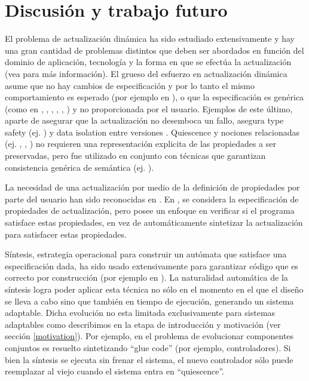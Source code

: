\section{Discusión y trabajo futuro}

El problema de actualización dinámica ha sido estudiado extensivamente y hay una gran cantidad de problemas distintos
que deben ser abordados en función del dominio de aplicación, tecnología y la forma en que se efectúa la actualización
(vea \cite{SMR:SMR1556} para más información). El grueso del esfuerzo en actualización dinámica asume que no hay cambios
de especificación y por lo tanto el mismo comportamiento es esperado (por ejemplo en \cite{mx:icse13}), o que la
especificación es genérica (como en \cite{Shen:2005:TUF:1095430.1081720}, \cite{5551162}, \cite{1167829},
\cite{4221625}, \cite{485222}, \cite{60317}) y no proporcionada por el usuario. Ejemplos de este último, aparte de
asegurar que la actualización no desemboca un fallo, asegura type safety (ej. \cite{Subramanian08dynamicsoftware}) y
data isolation entre versiones \cite{Stoyle07mutatismutandis:}. Quiescence \cite{60317} y nociones relacionadas (ej.
\cite{4359466},  \cite{Anderson:2009:MPM:1656437.1656448}, \cite{485222}) no requieren una representación explicita de
las propiedades a ser preservadas, pero fue utilizado en conjunto con técnicas que garantizan consistencia genérica de
semántica (ej. \cite{5546542}). 

La necesidad de una actualización por medio de la definición de propiedades por parte del usuario han sido reconocidas
en \cite{Baresi:2010:DBD:1882362.1882367}. En \cite{Hayden:2012:SVC:2189314.2189336}, se considera la especificación de
propiedades de actualización, pero posee un enfoque en verificar si el programa satisface estas propiedades, en vez de
automáticamente sintetizar la actualización para satisfacer estas propiedades. 

Síntesis, estrategia operacional para construir un autómata que satisface una especificación dada, ha sido usado
extensivamente para garantizar código que es correcto por construcción (por ejemplo en
\cite{Greenyer:2013:ISC:2491411.2491445}). La naturalidad automática de la síntesis logra poder aplicar esta técnica no
sólo en el momento en el que el diseño se lleva a cabo sino que también en tiempo de ejecución, generando un sistema
adaptable. Dicha evolución no esta limitada exclusivamente para sistemas adaptables como describimos en la etapa de
introducción y motivación (ver sección \ref{motivation}). Por ejemplo, en \cite{Pelliccione20082237} el problema de
evolucionar componentes conjuntos es resuelto sintetizando ``glue code'' (por ejemplo, controladores). Si bien la
síntesis se ejecuta sin frenar el sistema, el nuevo controlador sólo puede reemplazar al viejo cuando el sistema entra
en ``quiescence''.

